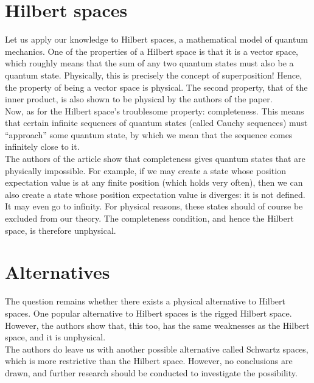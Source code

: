 \documentclass[12pt]{article}
\begin{document}
\begin{multicols}{2}
    \section*{Hilbert spaces}
    Let us apply our knowledge to Hilbert spaces, a mathematical model of quantum mechanics. One of the properties of a Hilbert space is that it is a vector space, which roughly means that the sum of any two quantum states must also be a quantum state. Physically, this is precisely the concept of superposition! Hence, the property of being a vector space is physical. The second property, that of the inner product, is also shown to be physical by the authors of the paper.\\
    Now, as for the Hilbert space's troublesome property: completeness. This means that certain infinite sequences of quantum states (called Cauchy sequences) must ``approach'' some quantum state, by which we mean that the sequence comes infinitely close to it.\\
    The authors of the article show that completeness gives quantum states that are physically impossible. For example, if we may create a state whose position expectation value is at any finite position (which holds very often), then we can also create a state whose position expectation value is diverges: it is not defined. It may even go to infinity. For physical reasons, these states should of course be excluded from our theory. The completeness condition, and hence the Hilbert space, is therefore unphysical. 
    \section*{Alternatives}
    The question remains whether there exists a physical alternative to Hilbert spaces. One popular alternative to Hilbert spaces is the rigged Hilbert space\cite{de_la_madrid_role_2005}. However, the authors show that, this too, has the same weaknesses as the Hilbert space, and it is unphysical.\\
    The authors do leave us with another possible alternative called Schwartz spaces, which is more restrictive than the Hilbert space. However, no conclusions are drawn, and further research should be conducted to investigate the possibility.
\end{multicols}
\printbibliography
\end{document}
